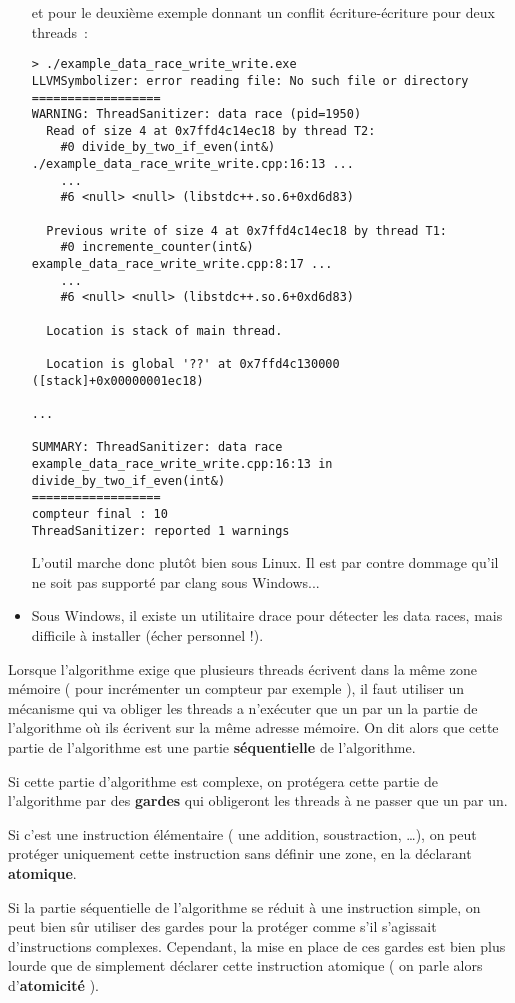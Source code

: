 \documentclass[fleqn,11pt]{article}
\begin{document}
\begin{itemize}
et pour le deuxième exemple donnant un conflit écriture-écriture pour deux threads~:
\begin{verbatim}
> ./example_data_race_write_write.exe
LLVMSymbolizer: error reading file: No such file or directory
==================
WARNING: ThreadSanitizer: data race (pid=1950)
  Read of size 4 at 0x7ffd4c14ec18 by thread T2:
    #0 divide_by_two_if_even(int&) ./example_data_race_write_write.cpp:16:13 ...
    ...
    #6 <null> <null> (libstdc++.so.6+0xd6d83)

  Previous write of size 4 at 0x7ffd4c14ec18 by thread T1:
    #0 incremente_counter(int&) example_data_race_write_write.cpp:8:17 ...
    ...
    #6 <null> <null> (libstdc++.so.6+0xd6d83)

  Location is stack of main thread.

  Location is global '??' at 0x7ffd4c130000 ([stack]+0x00000001ec18)

...

SUMMARY: ThreadSanitizer: data race example_data_race_write_write.cpp:16:13 in divide_by_two_if_even(int&)
==================
compteur final : 10
ThreadSanitizer: reported 1 warnings
\end{verbatim}

  L'outil marche donc plutôt bien sous Linux. Il est par contre dommage qu'il ne soit pas supporté par
  clang sous Windows...
\item Sous Windows, il existe un utilitaire drace pour détecter les data races, mais difficile à installer (écher personnel !).
\end{itemize}

Lorsque l'algorithme exige que plusieurs threads écrivent dans la même zone mémoire ( pour incrémenter un
compteur par exemple ), il faut utiliser un mécanisme qui va obliger les threads a n'exécuter que un par un
la partie de l'algorithme où ils écrivent sur la même adresse mémoire. On dit alors que cette partie de l'algorithme est une partie \textbf{séquentielle} de l'algorithme.

Si cette partie d'algorithme est complexe, on protégera cette partie de l'algorithme par des \textbf{gardes} qui obligeront les threads à ne passer que un par un.

Si c'est une instruction élémentaire ( une addition, soustraction, \ldots ), on peut protéger uniquement cette instruction sans définir une zone, en la déclarant \textbf{atomique}.

Si la partie séquentielle de l'algorithme se réduit à une instruction simple, on peut bien sûr utiliser des gardes pour la protéger comme s'il s'agissait d'instructions complexes. Cependant, la mise en place de ces gardes est bien plus lourde que de simplement déclarer cette instruction atomique ( on parle alors d'\textbf{atomicité} ).
\end{document}
